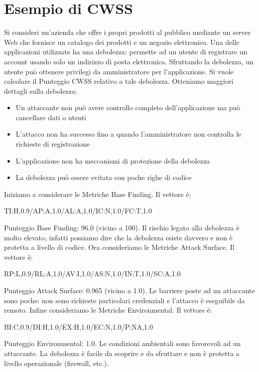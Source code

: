 \section{Esempio di CWSS}
Si consideri un’azienda che offre i propri
prodotti al pubblico mediante un server
Web che fornisce un catalogo dei prodotti e un negozio elettronico. Una delle applicazioni utilizzate ha una debolezza: permette ad un utente di registrare un account usando
solo un indirizzo di posta elettronica. Sfruttando la debolezza, un utente può ottenere privilegi
da amministratore per l’applicazione. Si vuole calcolare il Punteggio CWSS relativo a tale
debolezza. Otteniamo maggiori dettagli sulla
debolezza:
\begin{itemize}
    \item Un attaccante non può avere controllo
completo dell’applicazione ma può cancellare
dati o utenti
    \item L’attacco non ha successo fino a quando
l’amministratore non controlla le richieste di registrazione
    \item L’applicazione non ha meccanismi di protezione della
debolezza
    \item La debolezza può essere evitata con poche righe di codice 
\end{itemize}
Iniziamo a considerare le Metriche Base Finding. Il vettore è:

\begin{center}
    TI:H,0.9/AP:A,1.0/AL:A,1.0/IC:N,1.0/FC:T,1.0
\end{center}
Punteggio Base Finding: 96.0 (vicino a 100). Il rischio legato alla debolezza è molto elevato, infatti possiamo dire che la debolezza esiste davvero e non è protetta a livello di codice. Ora consideriamo le Metriche Attack Surface. Il vettore è:
\begin{center}
     RP:L,0.9/RL:A,1.0/AV:I,1.0/AS:N,1.0/IN:T,1.0/SC:A,1.0
\end{center}
Punteggio Attack Surface: 0.965 (vicino a 1.0). Le barriere poste ad un attaccante sono poche: non sono richieste particolari credenziali e l'attacco è eseguibile da remoto. Infine consideriamo le Metriche Environmental. Il vettore è:
\begin{center}
    BI:C,0.9/DI:H,1.0/EX:H,1.0/EC:N,1.0/P:NA,1.0 
\end{center}
Punteggio Environmental: 1.0. Le condizioni ambientali sono favorevoli ad un attaccante. La debolezza è facile da scoprire e da sfruttare e non è protetta a livello operazionale (firewall, etc.).

